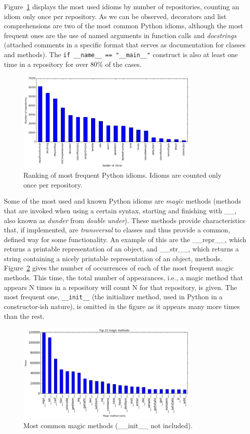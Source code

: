 \documentclass[conference]{IEEEtran}
\begin{document}
Figure~\ref{fig:idiom_ranking} displays the most used idioms by number of repositories, counting an idiom only once per repository. As we can be observed, decorators and list comprehensions are two of the most common Python idioms, although the most frequent ones are the use of named arguments in function calls and \emph{docstrings} (attached comments in a specific format that serves as documentation for classes and methods). The \verb|if __name__ == "__main__"| construct is also at least one time in a repository for over 80\% of the cases.

\begin{figure}[ht]
\centering
\includegraphics[width=90mm]{img/num_idiom_repo.png}
\caption{Ranking of most frequent Python idioms. Idioms are counted only once per repository.}
\label{fig:idiom_ranking}
\end{figure}

Some of the most used and known Python idioms are \emph{magic} methods (methods that are invoked when using a certain syntax, starting and finishing with \_\_, also known as \emph{dunder} from \emph{double under}). These methods provide characteristics that, if implemented, are \emph{transversal} to classes and thus provide a common, defined way for some functionality. An example of this are the \_\_repr\_\_, which returns a printable representation of an object, and \_\_str\_\_, which returns a string containing a nicely printable representation of an object, methods. Figure~\ref{fig:magic_ranking} gives the number of occurrences of each of the most frequent magic methods. This time, the total number of appearances, i.e., a magic method that appears N times in a repository will count N for that repository, is given. The most frequent one, \verb|__init__| (the initializer method, used in Python in a constructor-ish nature), is omitted in the figure as it appears many more times than the rest.

\begin{figure}[ht]
\centering
\includegraphics[width=90mm]{img/magic_methods.png}
\caption{Most common magic methods (\_\_init\_\_ not included).}
\label{fig:magic_ranking}
\end{figure}
\end{document}
